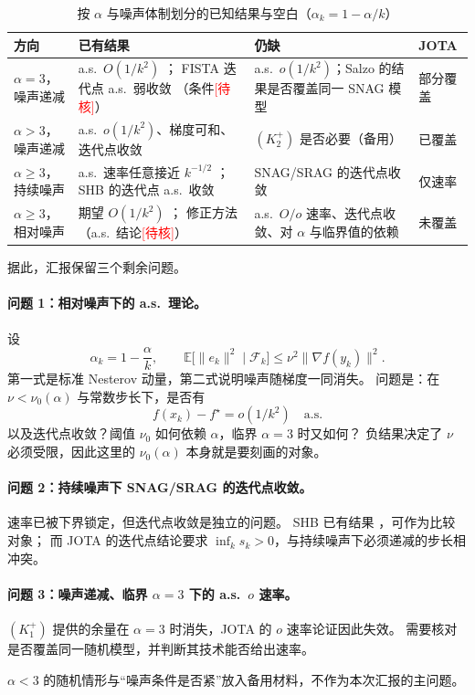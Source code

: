 \documentclass[11pt]{ctexart}
\newcommand{\tbv}{\textcolor{red}{[待核]}}
\begin{document}
\begin{table}[htbp]
\centering
\small
\caption{按 $\alpha$ 与噪声体制划分的已知结果与空白（$\alpha_k=1-\alpha/k$）}
\label{tab:gaps}
\begin{tabularx}{\textwidth}{@{}p{2.6cm}YYp{1.6cm}@{}}
\toprule
方向 & 已有结果 & 仍缺 & JOTA \\
\midrule
$\alpha=3$，噪声递减
& a.s.\ $O(1/k^2)$ \citep{attouch2026ravine}；
  FISTA 迭代点 a.s.\ 弱收敛 \citep{salzo2025iterates}（条件\tbv）
& a.s.\ $o(1/k^2)$；Salzo 的结果是否覆盖同一 SNAG 模型
& 部分覆盖 \\
\addlinespace
$\alpha>3$，噪声递减
& a.s.\ $o(1/k^2)$、梯度可和、迭代点收敛 \citep{attouch2026ravine}
& $(K_2^+)$ 是否必要（备用）
& 已覆盖 \\
\addlinespace
$\alpha\ge3$，持续噪声
& a.s.\ 速率任意接近 $k^{-1/2}$ \citep{attouch2026ravine}；
  SHB 的迭代点 a.s.\ 收敛 \citep{sebbouh2021,liu2022}
& SNAG/SRAG 的迭代点收敛
& 仅速率 \\
\addlinespace
$\alpha\ge3$，相对噪声
& 期望 $O(1/k^2)$ \citep{vaswani2019fast,gupta2024nesterov}；
  修正方法 \citep{yu2026shang}（a.s.\ 结论\tbv）
& a.s.\ $O/o$ 速率、迭代点收敛、对 $\alpha$ 与临界值的依赖
& 未覆盖 \\
\bottomrule
\end{tabularx}
\end{table}

据此，汇报保留三个剩余问题。

\paragraph{问题 1：相对噪声下的 a.s.\ 理论。}
设
\[
  \alpha_k=1-\frac{\alpha}{k},\qquad
  \mathbb E\big[\|e_k\|^2\mid\mathcal F_k\big]\le\nu^2\|\nabla f(y_k)\|^2 .
\]
第一式是标准 Nesterov 动量，第二式说明噪声随梯度一同消失。
问题是：在 $\nu<\nu_0(\alpha)$ 与常数步长下，是否有
\[
  f(x_k)-f^\star=o(1/k^2)\quad\text{a.s.}
\]
以及迭代点收敛？阈值 $\nu_0$ 如何依赖 $\alpha$，临界 $\alpha=3$ 时又如何？
负结果决定了 $\nu$ 必须受限，因此这里的 $\nu_0(\alpha)$ 本身就是要刻画的对象。

\paragraph{问题 2：持续噪声下 SNAG/SRAG 的迭代点收敛。}
速率已被下界锁定，但迭代点收敛是独立的问题。
SHB 已有结果 \citep{sebbouh2021,liu2022}，可作为比较对象；
而 JOTA 的迭代点结论要求 $\inf_k s_k>0$，与持续噪声下必须递减的步长相冲突。

\paragraph{问题 3：噪声递减、临界 $\alpha=3$ 下的 a.s.\ $o$ 速率。}
$(K_1^+)$ 提供的余量在 $\alpha=3$ 时消失，JOTA 的 $o$ 速率论证因此失效。
需要核对 \citet{salzo2025iterates} 是否覆盖同一随机模型，并判断其技术能否给出速率。

$\alpha<3$ 的随机情形与“噪声条件是否紧”放入备用材料，不作为本次汇报的主问题。



\end{document}
